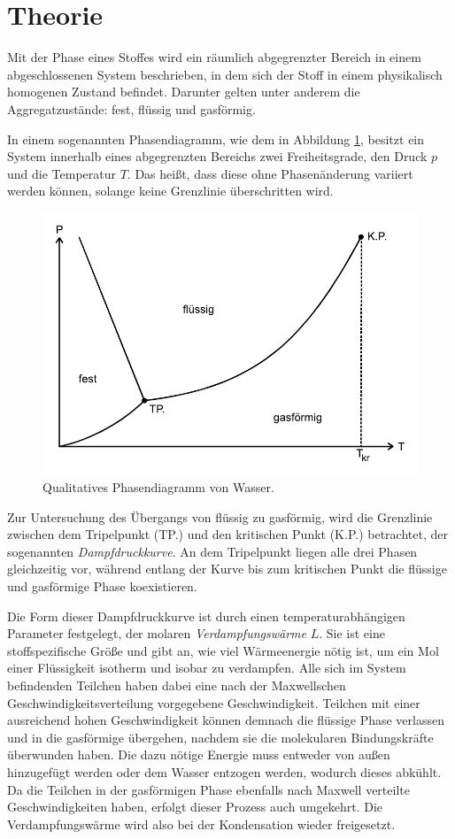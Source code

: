\section{Theorie}
\label{sec:Theorie}

Mit der Phase eines Stoffes wird ein räumlich abgegrenzter Bereich in einem abgeschlossenen System beschrieben,
in dem sich der Stoff in einem physikalisch homogenen Zustand befindet. 
Darunter gelten unter anderem die Aggregatzustände: fest, flüssig und gasförmig.

In einem sogenannten Phasendiagramm, wie dem in Abbildung \ref{fig:phasendiagramm}, besitzt ein System
innerhalb eines abgegrenzten Bereichs zwei Freiheitsgrade, den Druck $p$ und die Temperatur $T$.
Das heißt, dass diese ohne Phasenänderung variiert werden können, solange keine Grenzlinie überschritten wird.
\begin{figure} 
    \centering
    \includegraphics[width=12cm] {pictures/phasendiagramm.pdf}  
    \caption{Qualitatives Phasendiagramm von Wasser. \cite[1]{v203}}
    \label{fig:phasendiagramm}
\end{figure}

Zur Untersuchung des Übergangs von flüssig zu gasförmig, wird die Grenzlinie zwischen dem
Tripelpunkt (TP.) und den kritischen Punkt (K.P.) betrachtet, der sogenannten \textit{Dampfdruckkurve}.
An dem Tripelpunkt liegen alle drei Phasen gleichzeitig vor, während entlang der Kurve bis zum
kritischen Punkt die flüssige und gasförmige Phase koexistieren.

Die Form dieser Dampfdruckkurve ist durch einen temperaturabhängigen Parameter festgelegt, 
der molaren \textit{Verdampfungswärme} $L$. 
Sie ist eine stoffspezifische Größe und gibt an, wie viel Wärmeenergie nötig ist, 
um ein Mol einer Flüssigkeit isotherm und isobar zu verdampfen.
Alle sich im System befindenden Teilchen haben dabei eine nach der Maxwellschen Geschwindigkeitsverteilung
vorgegebene Geschwindigkeit. 
Teilchen mit einer ausreichend hohen Geschwindigkeit können demnach die flüssige Phase verlassen und in die
gasförmige übergehen, nachdem sie die molekularen Bindungskräfte überwunden haben.
Die dazu nötige Energie muss entweder von außen hinzugefügt werden oder dem Wasser entzogen werden,
wodurch dieses abkühlt. 
Da die Teilchen in der gasförmigen Phase ebenfalls nach Maxwell verteilte Geschwindigkeiten haben, 
erfolgt dieser Prozess auch umgekehrt. 
Die Verdampfungswärme wird also bei der Kondensation wieder freigesetzt.

